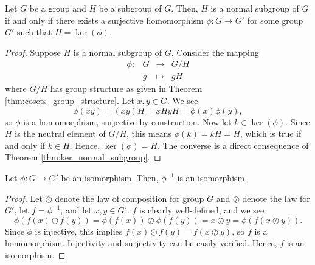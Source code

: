 \begin{thm}
Let $ G $ be a group and $ H $ be a subgroup of $ G $. Then, $ H $ is a normal subgroup of $ G $ if and only if there exists a surjective homomorphism $ \phi:G\to G' $ for some group $ G' $ such that $ H=\ker(\phi) $.
\end{thm}
\begin{proof}Suppose $ H $ is a normal subgroup of $ G $. Consider the mapping
\begin{equation*}
    \begin{array}{rccc}
        \phi: & G & \to & G/H \\
        & g & \mapsto & gH
    \end{array}
\end{equation*}
where $ G/H $ has group structure as given in Theorem \ref{thm:cosets_group_structure}. Let $ x,y\in G $. We see
\begin{equation*}
    \phi(xy)=(xy)H=xHyH=\phi(x)\phi(y),
\end{equation*}
so $ \phi $ is a homomorphism, surjective by construction. Now let $ k\in\ker(\phi) $. Since $ H $ is the neutral element of $ G/H $, this means $ \phi(k)=kH=H $, which is true if and only if $ k\in H $. Hence, $ \ker(\phi)=H $. The converse is a direct consequence of Theorem \ref{thm:ker_normal_subgroup}.
\end{proof}

\begin{thm}
Let $ \phi:G\to G' $ be an isomorphism. Then, $ \phi^{-1} $ is an isomorphism.
\end{thm}
\begin{proof}
Let $ \odot $ denote the law of composition for group $ G $ and $ \oslash $ denote the law for $ G' $, let $ f=\phi^{-1} $, and let $ x,y\in G' $.  $ f $ is clearly well-defined, and we see
\begin{equation*}
    \phi(f(x)\odot f(y))=\phi(f(x))\oslash\phi(f(y))=x\oslash y=\phi(f(x\oslash y)).
\end{equation*}
Since $ \phi $ is injective, this implies $ f(x)\odot f(y)=f(x\oslash y) $, so $ f $ is a homomorphism. Injectivity and surjectivity can be easily verified. Hence, $ f $ is an isomorphism.
\end{proof}

